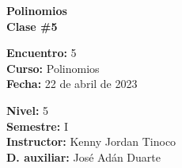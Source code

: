 \begin{center} \textbf
{
    \Large Polinomios \\ \vspace{2mm}Clase \#5
}
\end{center}

\begin{multicols}{2}
{
    \textbf{Encuentro:} 5\\
    \textbf{Curso:} Polinomios\\
    \textbf{Fecha:} 22 de abril de 2023\\
    \begin{flushright}
        \textbf{Nivel:} 5\\
        \textbf{Semestre:} I\\
        \textbf{Instructor:} Kenny Jordan Tinoco\\
        \textbf{D. auxiliar: }José Adán Duarte
    \end{flushright}
}
\end{multicols}

\thispagestyle{first-page-style}